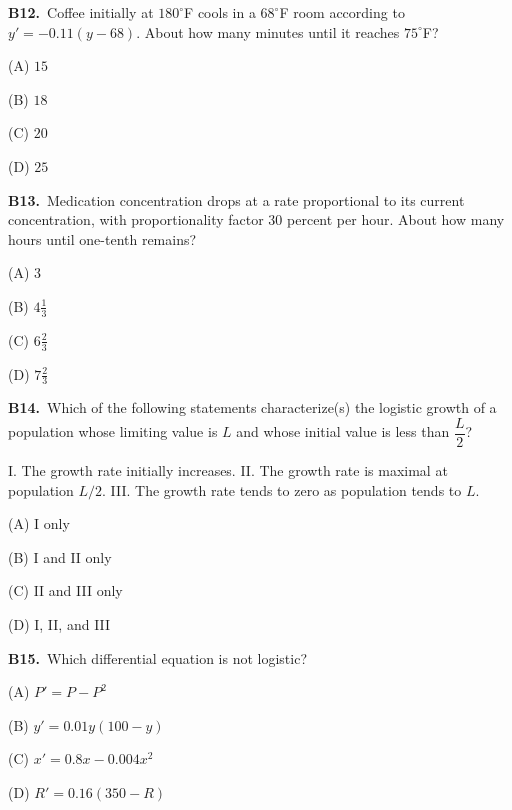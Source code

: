 \documentclass[11pt]{article}
\begin{document}
\bigskip\noindent\textbf{B12.}\ Coffee initially at $180^\circ$F cools in a $68^\circ$F room according to $y'=-0.11(y-68)$. About how many minutes until it reaches $75^\circ$F?
\begin{list}{}{\setlength{\leftmargin}{3em}\setlength{\labelwidth}{2.5em}\setlength{\itemsep}{0pt}\setlength{\topsep}{2pt}}
\item[(A)] $15$
\item[(B)] $18$
\item[(C)] $20$
\item[(D)] $25$
\end{list}

\bigskip\noindent\textbf{B13.}\ Medication concentration drops at a rate proportional to its current concentration, with proportionality factor 30 percent per hour. About how many hours until one-tenth remains?
\begin{list}{}{\setlength{\leftmargin}{3em}\setlength{\labelwidth}{2.5em}\setlength{\itemsep}{0pt}\setlength{\topsep}{2pt}}
\item[(A)] $3$
\item[(B)] $4\tfrac13$
\item[(C)] $6\tfrac23$
\item[(D)] $7\tfrac23$
\end{list}

\bigskip\noindent\textbf{B14.}\ Which of the following statements characterize(s) the logistic growth of a population whose limiting value is $L$ and whose initial value is less than $\dfrac{L}{2}$?

 I. The growth rate initially increases. II. The growth rate is maximal at population $L/2$. III. The growth rate tends to zero as population tends to $L$.
\begin{list}{}{\setlength{\leftmargin}{3em}\setlength{\labelwidth}{2.5em}\setlength{\itemsep}{0pt}\setlength{\topsep}{2pt}}
\item[(A)] I only
\item[(B)] I and II only
\item[(C)] II and III only
\item[(D)] I, II, and III
\end{list}

\bigskip\noindent\textbf{B15.}\ Which differential equation is not logistic?
\begin{list}{}{\setlength{\leftmargin}{3em}\setlength{\labelwidth}{2.5em}\setlength{\itemsep}{0pt}\setlength{\topsep}{2pt}}
\item[(A)] $P'=P-P^2$
\item[(B)] $y'=0.01y(100-y)$
\item[(C)] $x'=0.8x-0.004x^2$
\item[(D)] $R'=0.16(350-R)$
\end{list}
\end{document}
